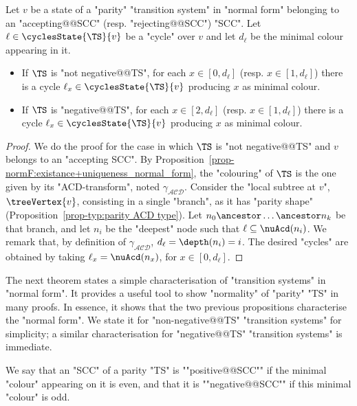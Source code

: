 \documentclass[10pt,a4paper]{amsart}
\renewcommand{\gg}{\gamma}
\newcommand\acdNoP{\mathcal{ACD}}
\begin{document}
\begin{proposition}\label{prop-normF:flowers-in-normal_form}
	Let $v$ be a state of a "parity" "transition system" in "normal form" belonging to an "accepting@@SCC" (resp. "rejecting@@SCC") "SCC". Let  $\ell\in \cyclesState{\TS}{v}$ be a "cycle" over $v$ and let $d_\ell$ be the minimal colour appearing in it. 
	\begin{itemize}
		\item If $\TS$ is "not negative@@TS", for each $x\in [0, d_\ell]$ (resp. $x\in [1, d_\ell]$) there is a cycle $\ell_x \in \cyclesState{\TS}{v}$ producing $x$ as minimal colour.
		\item If $\TS$ is "negative@@TS", for each $x\in [2, d_\ell]$ (resp. $x\in [1, d_\ell]$) there is a cycle $\ell_x \in \cyclesState{\TS}{v}$ producing $x$ as minimal colour.
	\end{itemize}
	
\end{proposition}
\begin{proof}
	We do the proof for the case in which $\TS$ is "not negative@@TS" and $v$ belongs to an "accepting SCC".
	By Proposition~\ref{prop-normF:existance+uniqueness_normal_form}, the "colouring" of $\TS$ is the one given by its "ACD-transform", noted $\gg_{\acdNoP}$. Consider the "local subtree at $v$", $\treeVertex{v}$, consisting in a single "branch", as it has "parity shape" (Proposition~\ref{prop-typ:parity ACD type}). Let $n_0\ancestor\dots \ancestor n_k$ be that branch, and let $n_i$ be the "deepest" node such that $\ell\subseteq \nuAcd(n_i)$. We remark that, by definition of $\gg_{\acdNoP}$, $d_\ell = \depth(n_i) = i$. The desired "cycles" are obtained by taking $\ell_x = \nuAcd(n_x)$, for $x\in [0, d_\ell]$.
\end{proof}

The next theorem states a simple characterisation of "transition systems" in "normal form". It provides a useful tool to show "normality" of "parity" "TS" in many proofs. In essence, it shows that the two previous propositions characterise the "normal form". We state it for "non-negative@@TS" "transition systems" for simplicity; a similar characterisation for "negative@@TS" "transition systems" is immediate.

\AP We say that an "SCC" of a parity "TS" is ""positive@@SCC"" if the minimal "colour" appearing on it is even, and that it is ""negative@@SCC"" if this minimal "colour" is odd. 
\end{document}
